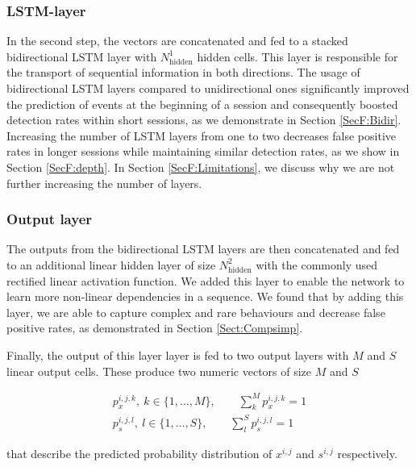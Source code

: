 \subsubsection{LSTM-layer}
In the second step, the vectors are concatenated and fed to a stacked bidirectional LSTM layer with $N^1_{\text{hidden}}$ hidden cells. This layer is responsible for the transport of sequential information in both directions. The usage of bidirectional LSTM layers compared to unidirectional ones significantly improved the prediction of events at the beginning of a session and consequently boosted detection rates within short sessions, as we demonstrate in Section \ref{SecF:Bidir}. Increasing the number of LSTM layers from one to two decreases false positive rates in longer sessions while maintaining similar detection rates, as we show in Section \ref{SecF:depth}. In Section \ref{SecF:Limitations}, we discuss why we are not further increasing the number of layers.


\subsubsection{Output layer}
The outputs from the bidirectional LSTM layers are then concatenated and fed to an additional linear hidden layer of size $N^2_{\text{hidden}}$ with the commonly used rectified linear activation function. We added this layer to enable the network to learn more non-linear dependencies in a sequence. 
We found that by adding this layer, we are able to capture complex and rare behaviours and decrease false positive rates, as demonstrated in Section \ref{Sect:Compsimp}.

Finally, the output of this layer layer is fed to two output layers with $M$ and $S$ linear output cells. These produce two numeric vectors of size $M$ and $S$

\begin{align*}
p_x^{i,j,k}, ~ k\in\{1,\dots,M\},~~~~~~~~~\sum_k^M p_x^{i,j,k}=1\\
p_s^{i,j,l}, ~ l\in\{1,\dots,S\},~~~~~~~~~\sum_l^S p_s^{i,j,l}=1
\end{align*}

\noindent that describe the predicted probability distribution of $x^{i,j}$ and $s^{i,j}$ respectively.



